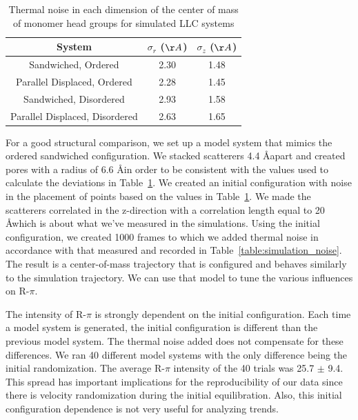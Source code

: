 \documentclass{article}
\begin{document}
  \begin{table}[!htb]
  \centering
  \begin{tabular}{c c c}
  \toprule
  System                         &   $\sigma_r$ ($\AA$) &   $\sigma_z$ ($\AA$) \\
  \midrule
  Sandwiched, Ordered            &      2.30            &     1.48             \\
  Parallel Displaced, Ordered    &      2.28            &     1.45             \\
  Sandwiched, Disordered         &      2.93            &     1.58             \\
  Parallel Displaced, Disordered &      2.63            &     1.65             \\
  \bottomrule
  \end{tabular}
  \caption{Thermal noise in each dimension of the center of mass of monomer
  head groups for simulated LLC systems}\label{table:com_sigmas}
  \end{table}

  For a good structural comparison, we set up a model system that mimics the
  ordered sandwiched configuration. We stacked scatterers 4.4 \AA apart and
  created pores with a radius of 6.6 \AA in order to be consistent with the
  values used to calculate the deviations in Table~\ref{table:com_sigmas}. We
  created an initial configuration with noise in the placement of points based on
  the values in Table~\ref{table:com_sigmas}. We made the scatterers correlated
  in the z-direction with a correlation length equal to 20 \AA which is about
  what we've measured in the simulations. Using the initial configuration, we
  created 1000 frames to which we added thermal noise in accordance with that
  measured and recorded in Table~\ref{table:simulation_noise}. The result is a
  center-of-mass trajectory that is configured and behaves similarly to the
  simulation trajectory. We can use that model to tune the various influences
  on R-$\pi$.

  The intensity of R-$\pi$ is strongly dependent on the initial configuration.
  Each time a model system is generated, the initial configuration is different
  than the previous model system. The thermal noise added does not compensate
  for these differences. We ran 40 different model systems with the only 
  difference being the initial randomization. The average R-$\pi$ intensity of the 
  40 trials was 25.7 $\pm$ 9.4. This spread has important implications for the
  reproducibility of our data since there is velocity randomization during the
  initial equilibration. Also, this initial configuration dependence is not 
  very useful for analyzing trends. 
\end{document}
